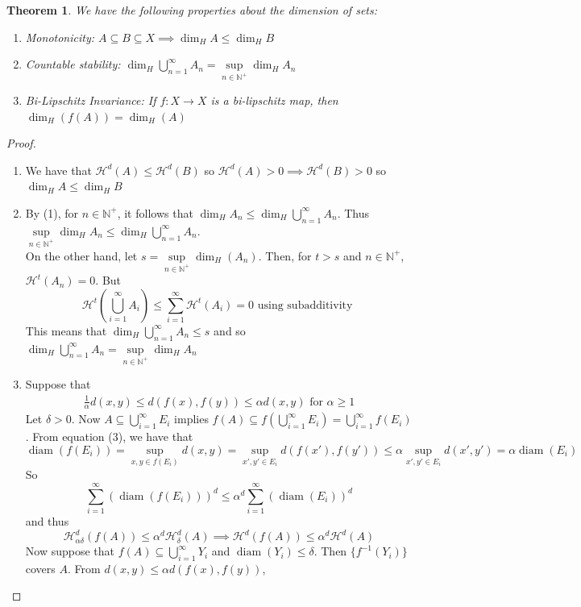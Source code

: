 \documentclass{article}
\theoremstyle{plain}
\newtheorem{thm}{Theorem}[section]
\theoremstyle{definition}
\DeclareMathOperator{\diam}{diam}
\theoremstyle{remark}
\begin{document}
\begin{thm}\label{thm:dimension}
    We have the following properties about the dimension of sets:
    \begin{enumerate}
    \item Monotonicity: $A \subseteq B\subseteq X \implies \dim_H A\le \dim_H B$
    \item Countable stability: $\dim_H \bigcup \limits _{n=1} ^\infty A_n = \sup \limits _{n\in \mathbb{N}^+}\dim_H A_n$
    \item Bi-Lipschitz Invariance: If $f:X\to X$ is a bi-lipschitz map, then $\dim_H(f(A))=\dim_H(A)$
    

\end{enumerate}
\end{thm}    

\begin{proof} $ $
    \begin{enumerate}
            \item We have that $\mathcal{H}^d(A)\le \mathcal{H}^d(B)$ so $\mathcal{H}^d(A) >0 \implies \mathcal{H}^d(B)>0$ so $\dim_H A\le \dim_H B$
        \item 
        By (1), for $n \in \mathbb{N}^+$, it follows that $\dim_H A_n \le \dim_H \bigcup \limits _{n=1} ^\infty A_n$. Thus $\sup \limits _{n\in \mathbb{N}^+} \dim_H A_n \le \dim_H \bigcup \limits _{n=1} ^\infty A_n$. ~\\On the other hand, let $s = \sup \limits _{n\in \mathbb{N}^+} \dim_H(A_n).$ Then, for $t > s$ and $n \in \mathbb{N}^+$,  $\mathcal{H}^t(A_n)=0$. But \[\mathcal{H}^t \left (\bigcup \limits_{i=1}^\infty A_i \right ) \le \sum \limits _{i=1}^\infty \mathcal{H}^t(A_i)=0 \text{ using subadditivity } \]
        This means that $\dim_H\bigcup \limits _{n=1} ^\infty A_n\le s$ and so $\dim_H \bigcup \limits _{n=1} ^\infty A_n = \sup \limits _{n\in \mathbb{N}^+} \dim_H A_n$
        \item Suppose that \begin{align}\frac{1}{\alpha} d(x,y)\le d(f(x), f(y))\le \alpha d(x,y) \text{ for }\alpha \ge 1\end{align}Let $\delta >0$. Now $A \subseteq \bigcup \limits _{i=1}^\infty E_i$ implies $f(A) \subseteq f \left (\bigcup \limits _{i=1}^\infty E_i \right ) = \bigcup \limits _{i=1}^\infty f(E_i)$. From equation (3), we have that
        \[\diam(f(E_i)) = \sup \limits _{x,y \in f(E_i)} d(x,y) = \sup \limits _{x',y' \in E_i}d(f(x'), f(y')) \le \alpha \sup \limits _{x',y' \in E_i} d(x',y') = \alpha \diam (E_i)
        \]
        So 
        \[\sum \limits _{i=1}^\infty (\diam (f(E_i)))^d \le \alpha^d \sum \limits _{i=1}^\infty (\diam (E_i))^d\] and thus \[\mathcal{H}^d_{\alpha \delta }(f(A))\le \alpha ^d\mathcal{H}_\delta ^d(A) \implies \mathcal{H}^d(f(A))\le \alpha ^d \mathcal{H}^d(A)\] Now suppose that $f(A) \subseteq \bigcup \limits _{i=1}^\infty Y_i$ and $\diam (Y_i) \le \delta $. Then $\{f^{-1}(Y_i)\}$ covers $A$. From $d(x, y) \le \alpha d(f(x),f(y))$, 

\end{enumerate}
\end{proof}
\end{document}
